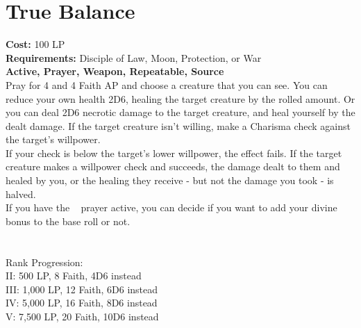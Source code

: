 \section{True Balance}\label{prayer:trueBalance}
\textbf{Cost:} 100 LP\\
\textbf{Requirements:} Disciple of Law, Moon, Protection, or War \\
\textbf{Active, Prayer, Weapon, Repeatable, Source}\\
Pray for 4 and 4 Faith AP and choose a creature that you can see.
You can reduce your own health 2D6, healing the target creature by the rolled amount.
Or you can deal 2D6 necrotic damage to the target creature, and heal yourself by the dealt damage.
If the target creature isn't willing, make a Charisma check against the target's willpower.\\
If your check is below the target's lower willpower, the effect fails.
If the target creature makes a willpower check and succeeds, the damage dealt to them and healed by you, or the healing they receive - but not the damage you took - is halved.\\
If you have the ~ prayer active, you can decide if you want to add your divine bonus to the base roll or not.\\
\\
\\
Rank Progression:\\
II: 500 LP, 8 Faith, 4D6 instead\\
III: 1,000 LP, 12 Faith, 6D6 instead\\
IV: 5,000 LP, 16 Faith, 8D6 instead\\
V: 7,500 LP, 20 Faith, 10D6 instead\\